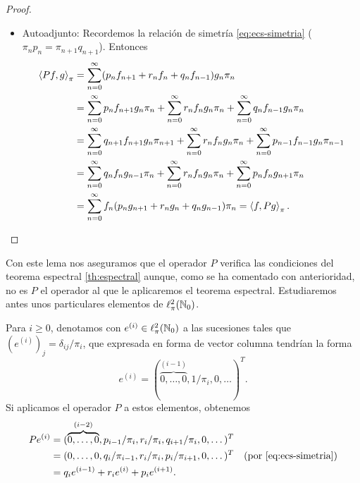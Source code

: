 \begin{proof}
\begin{itemize}
            \item Autoadjunto: Recordemos la relación de simetría \eqref{eq:ecs-simetria} ($\pi_n p_n = \pi_{n+1}q_{n+1}$). Entonces
            \begin{equation*}
                \begin{split}
                    \left\langle Pf , g \right\rangle_\pi&=\sum_{n=0}^\infty(p_n f_{n+1} + r_n f_n + q_n f_{n-1})g_n\pi_n\\
                    &= \sum_{n=0}^\infty p_n f_{n+1}g_n\pi_n + \sum_{n=0}^\infty r_n f_{n}g_n\pi_n + \sum_{n=0}^\infty q_n f_{n-1}g_n\pi_n \\
                    &= \sum_{n=0}^\infty q_{n+1} f_{n+1}g_n\pi_{n+1} + \sum_{n=0}^\infty r_n f_{n}g_n\pi_n + \sum_{n=0}^\infty p_{n-1} f_{n-1}g_n\pi_{n-1} \\
                    &= \sum_{n=0}^\infty q_{n} f_{n}g_{n-1}\pi_{n} + \sum_{n=0}^\infty r_n f_{n}g_n\pi_n + \sum_{n=0}^\infty p_{n} f_{n}g_{n+1}\pi_{n} \\
                    &= \sum_{n=0}^\infty f_n(p_n g_{n+1} + r_n g_n+ q_n g_{n-1})\pi_n = \left\langle f , Pg \right\rangle_\pi.
                \end{split}  
            \end{equation*}

        \end{itemize}

    \end{proof}

    Con este lema nos aseguramos que el operador $P$ verifica las condiciones del teorema espectral \ref{th:espectral} aunque, como se ha comentado con anterioridad, no es $P$ el operador al que le aplicaremos el teorema espectral. Estudiaremos antes unos particulares elementos de $\ell^2_\pi(\mathbb{N}_0)$.

    Para $i\geq 0$, denotamos con $e^{(i)}\in\ell^2_\pi(\mathbb{N}_0)$ a las sucesiones tales que $(e^{(i)})_j = \delta_{ij}/\pi_i$, que expresada en forma de vector columna tendrían la forma
    $$
    e^{(i)}=(\overbrace{0,\dots,0}^{(i-1)},1/\pi_i,0,\dots)^T.
    $$
    Si aplicamos el operador $P$ a estos elementos, obtenemos
    \begin{equation*}
        \begin{split}
            Pe^{(i)} &= (\overbrace{0,\dots,0}^{(i-2)}, p_{i-1}/\pi_i, r_i/\pi_i, q_{i+1}/\pi_i,0,\dots)^T \\
            &= (0,\dots,0, q_i/\pi_{i-1},  r_i/\pi_i, p_i/\pi_{i+1},0,\dots)^T \ \ \ \text{(por \eqref{eq:ecs-simetria})}\\
            &= q_i e^{(i-1)} + r_i e^{(i)} + p_i e^{(i+1)}.
        \end{split}
    \end{equation*}

